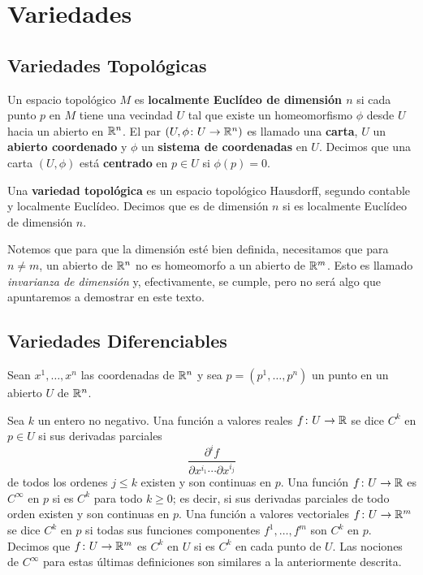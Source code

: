 \section{Variedades}

\cite[\S 1, 5 y 8]{TuManifolds}

\subsection{Variedades Topológicas}

\begin{definition}
	Un espacio topológico $M$ es \textbf{localmente Euclídeo de dimensión $n$} si cada punto $p$ en $M$ tiene una vecindad $U$ tal que existe un homeomorfismo $\phi$ desde $U$ hacia un abierto en $\mathbb{R}^{n}$. El par $(U,\phi \colon U \to \mathbb{R}^{n})$ es llamado una \textbf{carta}, $U$ un \textbf{abierto coordenado} y $\phi$ un \textbf{sistema de coordenadas} en $U$. Decimos que una carta $(U, \phi)$ está \textbf{centrado} en $p \in U$ si $\phi(p) = 0$.
\end{definition}

\begin{definition}
	Una \textbf{variedad topológica} es un espacio topológico Hausdorff, segundo contable y localmente Euclídeo. Decimos que es de dimensión $n$ si es localmente Euclídeo de dimensión $n$.
\end{definition}

Notemos que para que la dimensión esté bien definida, necesitamos que para $n \neq m$, un abierto de $\mathbb{R}^{n}$ no es homeomorfo a un abierto de $\mathbb{R}^{m}$. Esto es llamado \textit{invarianza de dimensión} y, efectivamente, se cumple, pero no será algo que apuntaremos a demostrar en este texto.

\subsection{Variedades Diferenciables}

Sean $x^{1},\dots,x^{n}$ las coordenadas de $\mathbb{R}^{n}$ y sea $p = (p^{1},\dots,p^{n})$ un punto en un abierto $U$ de $\mathbb{R}^{n}$.

\begin{definition}
	Sea $k$ un entero no negativo. Una función a valores reales $f \colon U \to \mathbb{R}$ se dice $C^{k}$ en $p \in U$ si sus derivadas parciales
	\[ \frac{\partial^{i} f}{\partial x^{i_{1}}\cdots \partial x^{i_{j}}} \]
	de todos los ordenes $j \leq k$ existen y son continuas en $p$. Una función $f \colon U \to \mathbb{R}$ es $C^{\infty}$ en $p$ si es $C^{k}$ para todo $k \geq 0$; es decir, si sus derivadas parciales de todo orden existen y son continuas en $p$. Una función a valores vectoriales $f \colon U \to \mathbb{R}^{m}$ se dice $C^{k}$ en $p$ si todas sus funciones componentes $f^{1},\dots,f^{m}$ son $C^{k}$ en $p$. Decimos que $f \colon U \to \mathbb{R}^{m}$ es $C^{k}$ en $U$ si es $C^{k}$ en cada punto de $U$. Las nociones de $C^{\infty}$ para estas últimas definiciones son similares a la anteriormente descrita.
\end{definition}

